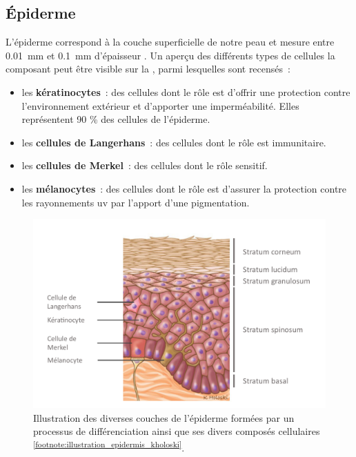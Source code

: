 \subsection{Épiderme}
L’épiderme correspond à la couche superficielle de notre peau et mesure entre \SI{0,01}{\milli\metre} et \SI{0,1}{\milli\metre} d’épaisseur \cite{Sandby-Moller2003}. Un aperçu des différents types de cellules la composant peut être visible sur la , parmi lesquelles sont recensés~:
\begin{itemize}
    \item les \textbf{kératinocytes}~: des cellules dont le rôle est d'offrir une protection contre l'environnement extérieur et d'apporter une imperméabilité. Elles représentent 90 \% des cellules de l'épiderme.
    \item les \textbf{cellules de Langerhans}~: des cellules dont le rôle est immunitaire.
    \item les \textbf{cellules de Merkel}~: des cellules dont le rôle sensitif.
    \item les \textbf{mélanocytes}~: des cellules dont le rôle est d'assurer la protection contre les rayonnements \gls{uv} par l'apport d'une pigmentation.
\end{itemize}\par

 \begin{figure}[H]
    \centering
    \includegraphics[width=0.9\linewidth]{contents/chapter_1/resources/illustration_epidermis_kholoski.pdf}
    \caption{Illustration des diverses couches de l'épiderme formées par un processus de différenciation ainsi que ses divers composés cellulaires \textsuperscript{\ref{footnote:illustration_epidermis_kholoski}}.}
    \label{fig:illustration_epidermis_kholoski}
\end{figure}\par

